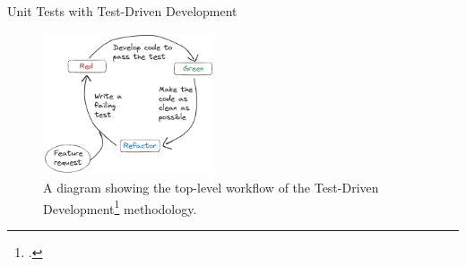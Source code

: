 \documentclass[10pt,aspectratio=169]{beamer}
\begin{document}
\begin{frame}{Unit Tests with Test-Driven Development}
    \begin{figure}[H]
        \hspace*{-1cm}
        \includegraphics[width=0.45\textwidth]{images/excalidraw_tdd.png}
        \caption{A diagram showing the top-level workflow of the Test-Driven Development\footcite{beckTestDrivenDevelopment2022} methodology.}
        \label{fig:tdd_workflow}
    \end{figure}
    \vspace*{1cm}
\end{frame}
\end{document}
